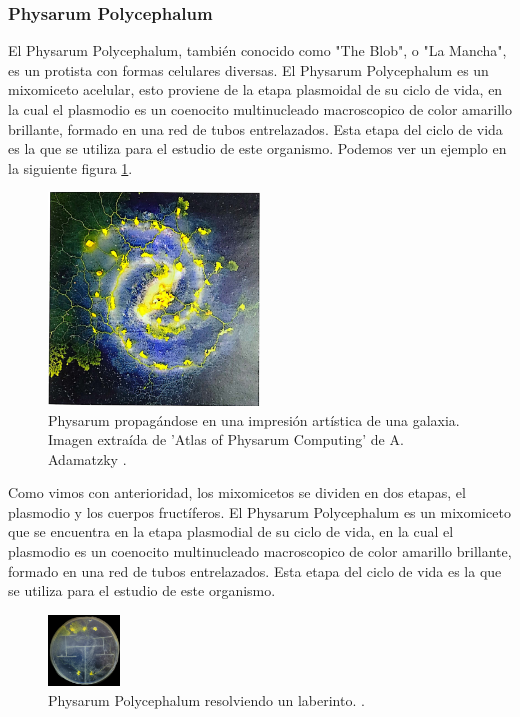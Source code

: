 \subsubsection{Physarum Polycephalum}
    El Physarum Polycephalum, tambi\'en conocido como "The Blob", 
        o "La Mancha", es un protista con formas celulares diversas. El Physarum Polycephalum
        es un mixomiceto acelular, esto proviene de la etapa plasmoidal de su ciclo de vida,
        en la cual el plasmodio es un coenocito multinucleado macroscopico de color amarillo 
        brillante, formado en una red de tubos entrelazados. Esta etapa del ciclo de vida es 
        la que se utiliza para el estudio de este organismo.\cite{Dee1960} Podemos ver un ejemplo
        en la siguiente figura \ref{fig:PhysarumPolycephalum01}.
    \begin{figure}[h]  
        \centering
        \includegraphics[width=0.5\textwidth]{./images/marco_teorico/Physarum/PhyrasumPolycephalum01.png}
        \caption{Physarum propag\'andose en una impresi\'on art\'istica de una galaxia. Imagen extra\'ida de 'Atlas of Physarum Computing' de A. Adamatzky \cite{Adamatzky2014}.}
        \label{fig:PhysarumPolycephalum01}
    \end{figure} 
    \vskip 0.5cm
    Como vimos con anterioridad, los mixomicetos se dividen en dos etapas, el plasmodio y los cuerpos fruct\'iferos.
        El Physarum Polycephalum es un mixomiceto que se encuentra en la etapa plasmodial de su ciclo de vida, 
        en la cual el plasmodio es un coenocito multinucleado macroscopico de color amarillo brillante, formado en una red de tubos entrelazados.
        Esta etapa del ciclo de vida es la que se utiliza para el estudio de este organismo.\cite{Dee1960}
    \begin{figure}
        \centering
        \includegraphics[width=0.17\textwidth]{./images/marco_teorico/Physarum/LaberintoPhysarum.png}
        \caption{Physarum Polycephalum resolviendo un laberinto. \cite{Adamatzky2014}.}
        \label{fig:PhysarumPolycephalum02}
    \end{figure}
